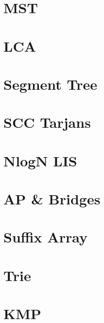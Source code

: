 \documentclass[twocolumn]{article}
\begin{document}
{    \newpage

    \section{MST}
    

    \newpage

    \section{LCA}
    

    \newpage

    \section{Segment Tree}
    
    \section{SCC Tarjans}
    
    \section{NlogN LIS}
    

    \newpage

    \section{AP \& Bridges}
    
    
    \newpage

    \section{Suffix Array}
    

    \newpage

    \section{Trie}
    
    \section{KMP}
    
}
\end{document}
